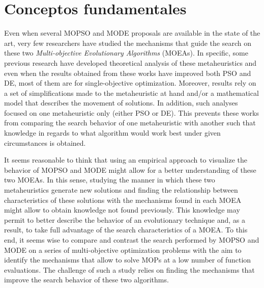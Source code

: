 \section{Conceptos fundamentales} \label{}

Even when several MOPSO and MODE proposals are available in the state of the art, very few researchers have studied the mechanisms that guide the search on these two \emph{Multi-objective Evolutionary Algorithms} (MOEAs). In specific, some previous research have developed theoretical analysis of these metaheuristics \cite{Vandenbergh2006,Clerc2002} and even when the results obtained from these works have improved both PSO and DE, most of them are for single-objective optimization. Moreover, results rely on a set of simplifications made to the metaheuristic at hand and/or a mathematical model that describes the movement of solutions. In addition, such analyses focused on one metaheuristic only (either PSO or DE). This prevents these works from comparing the search behavior of one metaheuristic with another such that knowledge in regards to what algorithm would work best under given circumstances is obtained. 

It seems reasonable to think that using an empirical approach to visualize the behavior of MOPSO and MODE might allow for a better understanding of these two MOEAs. In this sense, studying the manner in which these two metaheuristics generate new solutions and finding the relationship between characteristics of these solutions with the mechanisms found in each MOEA might allow to obtain knowledge not found previously. This knowledge may permit to better describe the behavior of an evolutionary technique and, as a result, to take full advantage of the search characteristics of a MOEA. To this end, it seems wise to compare and contrast the search performed by MOPSO and MODE on a series of multi-objective optimization problems with the aim to identify the mechanisms that allow to solve MOPs at a low number of function evaluations. The challenge of such a study relies on finding the mechanisms that improve the search behavior of these two algorithms.

